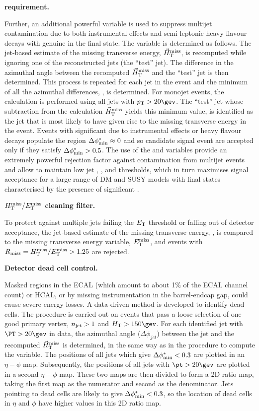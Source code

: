 {\bf \bdphi requirement.} 

Further, an additional powerful variable \bdphi is used to suppress
multijet contamination due to both instrumental effects and
semi-leptonic heavy-flavour decays with genuine \met in the final
state. The variable is determined as follows. The jet-based estimate
of the missing transverse energy, ${\mbox{$\vec{H}_{\rm T}^{\rm miss}$}}$, is recomputed while
ignoring one of the reconstructed jets (the ``test'' jet). The
difference in the azimuthal angle between the recomputed $\mbox{$\vec{H}_{\rm T}^{\rm miss}$}$
and the ``test'' jet is then determined. This process is repeated for
each jet in the event and the minimum of all the azimuthal
differences, \bdphi, is determined. For monojet events, the calculation is 
performed using all jets with $\Pt > 20\gev$. The ``test'' jet whose subtraction
from the calculation $\mbox{$\vec{H}_{\rm T}^{\rm miss}$}$ yields this minimum value, is
identified as the jet that is most likely to have given rise to the
missing transverse energy in the event. Events with significant \mht
due to instrumental effects or heavy flavour decays populate the
region $\mbox{$\Delta\phi^{*}_{\rm min}$} \approx 0$ and so candidate signal event are accepted
only if they satisfy $\mbox{$\Delta\phi^{*}_{\rm min}$} > 0.5$. The use of the \bdphi and \alphat
variables provide an extremely powerful rejection factor against
contamination from multijet events and allow to maintain low jet \PT,
\HT, and \mht thresholds, which in turn maximises signal acceptance
for a large range of DM and SUSY models with final states
characterised by the presence of significant \met.

{\bf $\mbox{$H_{\rm T}^{\rm miss}$}/\mbox{$E_\text{T}^{\rm miss}$}$ cleaning filter.} 

To protect against multiple jets failing the ${E_{\text T}}$ threshold or
falling out of detector acceptance, the jet-based
estimate of the missing transverse energy, \mht, is compared to the
missing transverse energy variable, $\mbox{$E_\text{T}^{\rm miss}$}$, and events with $R_{\rm
  miss}=\mbox{$H_{\rm T}^{\rm miss}$}/\mbox{$E_\text{T}^{\rm miss}$} > 1.25$ are rejected.
  
{\bf Detector dead cell control.}

Masked regions in the ECAL (which amount to about 1\% of the ECAL channel count)
or HCAL, or by missing instrumentation in the barrel-endcap gap, could cause 
severe energy losses. A data-driven method is developed to identify dead cells. The 
procedure is carried out on events that pass a loose selection of one good primary vertex,
$n_{\text{jet}}>1$ and $\scalht>150\gev$. For each identified jet with
$\PT > 20 \gev$ in data, the azimuthal angle ($\Delta\phi_{jet}$) between the jet and the 
recomputed ${\mbox{$\vec{H}_{\rm T}^{\rm miss}$}}$ is determined, in the same way as in the procedure to compute the \bdphi 
variable. The positions of all jets which give $\mbox{$\Delta\phi^{*}_{\rm min}$} < 0.3$ are plotted in
an $\eta-\phi$ map. Subsequently, the positions of all jets with
$\pt>20\gev$ are plotted in a second $\eta-\phi$ map.
These two maps are then divided to form a 2D ratio map, taking the
first map as the numerator and second as the denominator.
Jets pointing to dead cells are likely to give $\mbox{$\Delta\phi^{*}_{\rm min}$} < 0.3$, so the
location of dead cells in $\eta$ and $\phi$ have higher values in this 2D ratio map. 

